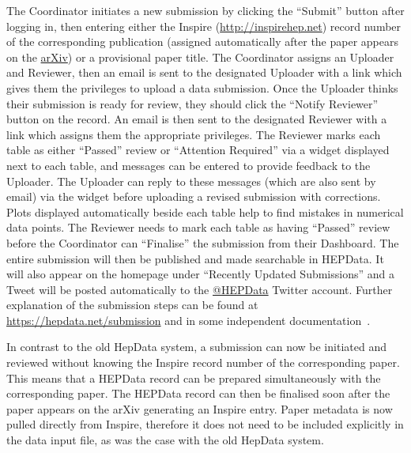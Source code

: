 \documentclass[a4paper]{jpconf}
\begin{document}
The Coordinator initiates a new submission by clicking the ``Submit'' button after logging in, then entering either the Inspire (\url{http://inspirehep.net}) record number of the corresponding publication (assigned automatically after the paper appears on the \href{https://arxiv.org/}{arXiv}) or a provisional paper title.  The Coordinator assigns an Uploader and Reviewer, then an email is sent to the designated Uploader with a link which gives them the privileges to upload a data submission.  Once the Uploader thinks their submission is ready for review, they should click the ``Notify Reviewer'' button on the record.  An email is then sent to the designated Reviewer with a link which assigns them the appropriate privileges.  The Reviewer marks each table as either ``Passed'' review or ``Attention Required'' via a widget displayed next to each table, and messages can be entered to provide feedback to the Uploader.  The Uploader can reply to these messages (which are also sent by email) via the widget before uploading a revised submission with corrections.  Plots displayed automatically beside each table help to find mistakes in numerical data points.  The Reviewer needs to mark each table as having ``Passed'' review before the Coordinator can ``Finalise'' the submission from their Dashboard.  The entire submission will then be published and made searchable in HEPData.  It will also appear on the homepage under ``Recently Updated Submissions'' and a Tweet will be posted automatically to the \href{https://twitter.com/HEPData}{@HEPData} Twitter account.  Further explanation of the submission steps can be found at \url{https://hepdata.net/submission} and in some independent documentation~\cite{matteo_bonanomi_2016_197109}.

In contrast to the old HepData system, a submission can now be initiated and reviewed without knowing the Inspire record number of the corresponding paper.  This means that a HEPData record can be prepared simultaneously with the corresponding paper.  The HEPData record can then be finalised soon after the paper appears on the arXiv generating an Inspire entry.  Paper metadata is now pulled directly from Inspire, therefore it does not need to be included explicitly in the data input file, as was the case with the old HepData system.
\end{document}
